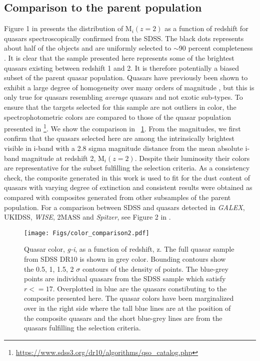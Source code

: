 \documentclass{aa}    %
\newcommand{\figref}[1]{\ref{fig:#1}}
\newcommand{\Fig}[1]{\figurename~\figref{#1}}
\newcommand{\fig}[1]{\Fig{#1}}
\newcommand{\figlabel}[1]{\label{fig:#1}}
\newcommand{\sectlabel}[1]{\label{sect:#1}}
\begin{document}
\subsection{Comparison to the parent population}  \sectlabel{parents}

Figure 1 in \citet{Shen2011} presents the distribution of M$_i(z=2)$ as a function of redshift for quasars spectroscopically confirmed from the SDSS. The black dots represents about half of the objects and are uniformly selected to $\sim$90 percent completeness \citep{Richards2002, VandenBerk2005}. It is clear that the sample presented here represents some of the brightest quasars existing between redshift 1 and 2. It is therefore potentially a biased subset of the parent quasar population. Quasars have previously been shown to exhibit a large degree of homogeneity over many orders of magnitude \citep{Dietrich2002}, but this is only true for quasars resembling \textit{average} quasars and not exotic sub-types. To ensure that the targets selected for this sample are not outliers in color, the spectrophotometric colors are compared to those of the quasar population presented in \citet{Paris2014}\footnote{\url{https://www.sdss3.org/dr10/algorithms/qso_catalog.php}}. We show the comparison in \fig{color_comparison}. From the magnitudes, we first confirm that the quasars selected here are among the intrinsically brightest visible in i-band with a 2.8 sigma magnitude distance from the mean absolute i-band magnitude at redshift 2, M$_i(z=2)$. Despite their luminosity their colors are representative for the subset fulfilling the selection criteria. As a consistency check, the composite generated in this work is used to fit for the dust content of quasars with varying degree of extinction and consistent results were obtained as compared with composites generated from other subsamples of the parent population. For a comparison between SDSS and quasars detected in \textit{GALEX}, UKIDSS, \textit{WISE}, 2MASS and \textit{Spitzer}, see Figure 2 in \citet{Krawczyk2013}.


 \begin{figure}[t!]
   \centering
   \texttt{[image: Figs/color\_comparison2.pdf]}
   \caption[]{Quasar color, \textit{g-i},  as a function of redshift, z. The full quasar sample from SDSS DR10 \citep{Paris2014} is shown in grey color. Bounding contours show the 0.5, 1, 1.5, 2 $\sigma$ contours of the density of points. The blue-grey points are individual quasars from the SDSS sample which satisfy $r <= 17$. Overplotted in blue are the quasars constibuting to the composite presented here. The quasar colors have been marginalized over in the right side where the tall blue lines are at the position of the composite quasars and the short blue-grey lines are from the quasars fulfilling the selection criteria.}
  \figlabel{color_comparison}
 \end{figure}
\end{document}
